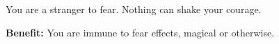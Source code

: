 
You are a stranger to fear. Nothing can shake your courage.

\textbf{Benefit:} You are immune to fear effects, magical or otherwise.